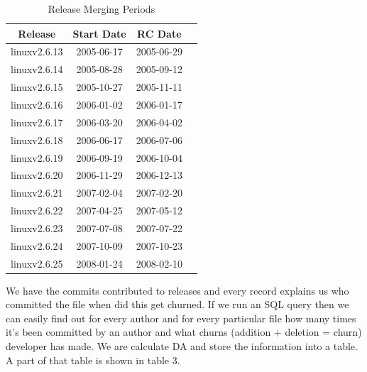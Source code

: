 \documentclass{acm_proc_article-sp}
\begin{document}
\begin{table}[ht]
\caption{Release Merging Periods}  %
\centering 						%
\begin{tabular}{c c c c}				%
\hline\hline						%
Release 			& Start Date		& RC Date \\ [0.5ex]
\hline 							%
linuxv2.6.13		& 2005-06-17	& 2005-06-29 \\
linuxv2.6.14		& 2005-08-28	& 2005-09-12 \\
linuxv2.6.15		& 2005-10-27	& 2005-11-11 \\
linuxv2.6.16		& 2006-01-02	& 2006-01-17 \\
linuxv2.6.17		& 2006-03-20	& 2006-04-02 \\
linuxv2.6.18		& 2006-06-17	& 2006-07-06 \\
linuxv2.6.19		& 2006-09-19	& 2006-10-04 \\
linuxv2.6.20  		& 2006-11-29	& 2006-12-13 \\
linuxv2.6.21		& 2007-02-04	& 2007-02-20 \\
linuxv2.6.22		& 2007-04-25	& 2007-05-12 \\
linuxv2.6.23		& 2007-07-08	& 2007-07-22 \\
linuxv2.6.24		& 2007-10-09	& 2007-10-23 \\
linuxv2.6.25		& 2008-01-24	& 2008-02-10 \\
[1ex]							%
\hline 							%
\end{tabular}
\label{table:nonlin} 				%
\end{table}

We have the commits contributed to releases and every record explains us who committed the file when did this get churned. If we run an SQL query then we can easily find out for every author and for every particular file how many times it's been committed by an author and what churns (addition + deletion = churn) developer has made. We are calculate DA and store the information into a table. A part of that table is shown in table 3.
\end{document}
